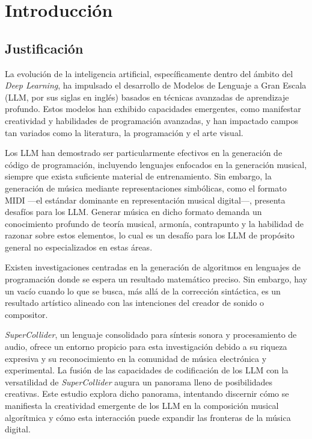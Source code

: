 \chapter{Introducción}

\section{Justificación}

La evolución de la inteligencia artificial, específicamente dentro del ámbito del \textit{Deep Learning}, ha impulsado el desarrollo de Modelos de Lenguaje a Gran Escala (LLM, por sus siglas en inglés) basados en técnicas avanzadas de aprendizaje profundo. Estos modelos han exhibido capacidades emergentes, como manifestar creatividad y habilidades de programación avanzadas, y han impactado campos tan variados como la literatura, la programación y el arte visual.

Los LLM han demostrado ser particularmente efectivos en la generación de código de programación, incluyendo lenguajes enfocados en la generación musical, siempre que exista suficiente material de entrenamiento. Sin embargo, la generación de música mediante representaciones simbólicas, como el formato MIDI —el estándar dominante en representación musical digital—, presenta desafíos para los LLM. Generar música en dicho formato demanda un conocimiento profundo de teoría musical, armonía, contrapunto y la habilidad de razonar sobre estos elementos, lo cual es un desafío para los LLM de propósito general no especializados en estas áreas.

Existen investigaciones centradas en la generación de algoritmos en lenguajes de programación donde se espera un resultado matemático preciso. Sin embargo, hay un vacío cuando lo que se busca, más allá de la corrección sintáctica, es un resultado artístico alineado con las intenciones del creador de sonido o compositor.

\textit{SuperCollider}, un lenguaje consolidado para síntesis sonora y procesamiento de audio, ofrece un entorno propicio para esta investigación debido a su riqueza expresiva y su reconocimiento en la comunidad de música electrónica y experimental. La fusión de las capacidades de codificación de los LLM con la versatilidad de \textit{SuperCollider} augura un panorama lleno de posibilidades creativas. Este estudio explora dicho panorama, intentando discernir cómo se manifiesta la creatividad emergente de los LLM en la composición musical algorítmica y cómo esta interacción puede expandir las fronteras de la música digital.

